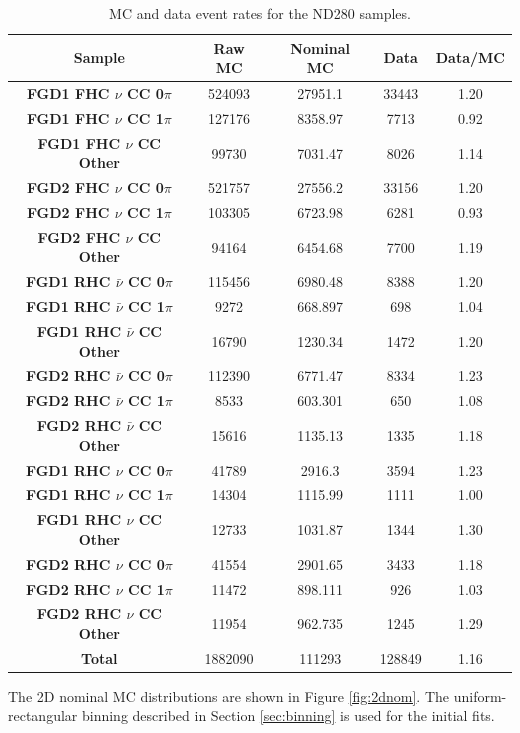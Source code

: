 \begin{center}
\begin{table}[h]
\center
\begin{tabular}{c||c|c|c|c}
\hline \hline
\textbf{Sample} & \textbf{Raw MC} & \textbf{Nominal MC} & \textbf{Data} & \textbf{Data/MC} \\
\hline
\hline
\textbf{FGD1 FHC $\nu$ CC 0$\pi$} & 524093 & 27951.1 & 33443 & 1.20 \\ 
\textbf{FGD1 FHC $\nu$ CC 1$\pi$} & 127176 & 8358.97 & 7713 & 0.92 \\ 
\textbf{FGD1 FHC $\nu$ CC Other} & 99730 & 7031.47 & 8026 & 1.14 \\ \hline
\textbf{FGD2 FHC $\nu$ CC 0$\pi$} & 521757 & 27556.2 & 33156 & 1.20 \\
\textbf{FGD2 FHC $\nu$ CC 1$\pi$} & 103305 & 6723.98 & 6281 & 0.93\\
\textbf{FGD2 FHC $\nu$ CC Other} & 94164 & 6454.68 & 7700 & 1.19 \\ \hline
\textbf{FGD1 RHC $\bar{\nu}$ CC 0$\pi$} & 115456 & 6980.48 & 8388 & 1.20\\
\textbf{FGD1 RHC $\bar{\nu}$ CC 1$\pi$} & 9272 & 668.897 & 698 & 1.04\\
\textbf{FGD1 RHC $\bar{\nu}$ CC Other} & 16790 & 1230.34 & 1472 & 1.20\\ \hline
\textbf{FGD2 RHC $\bar{\nu}$ CC 0$\pi$} & 112390 & 6771.47 & 8334 & 1.23\\
\textbf{FGD2 RHC $\bar{\nu}$ CC 1$\pi$} & 8533 & 603.301 & 650 & 1.08\\
\textbf{FGD2 RHC $\bar{\nu}$ CC Other} & 15616 & 1135.13 & 1335 & 1.18\\ \hline
\textbf{FGD1 RHC $\nu$ CC 0$\pi$} & 41789 & 2916.3 & 3594 & 1.23\\
\textbf{FGD1 RHC $\nu$ CC 1$\pi$} & 14304 & 1115.99 & 1111 & 1.00\\
\textbf{FGD1 RHC $\nu$ CC Other} & 12733 & 1031.87 & 1344 & 1.30\\ \hline
\textbf{FGD2 RHC $\nu$ CC 0$\pi$} & 41554 & 2901.65 & 3433 & 1.18\\
\textbf{FGD2 RHC $\nu$ CC 1$\pi$} & 11472 & 898.111 & 926 & 1.03\\ 
\textbf{FGD2 RHC $\nu$ CC Other} & 11954 & 962.735 & 1245 & 1.29\\ \hline
\textbf{Total} & 1882090 & 111293 & 128849 & 1.16\\ \hline\hline
\end{tabular}
\caption{MC and data event rates for the ND280 samples.}
\label{tab:nomrates}
\end{table}
\end{center}
The 2D nominal MC distributions are shown in Figure \ref{fig:2dnom}. The uniform-rectangular binning described in Section \ref{sec:binning} is used for the initial fits. 

